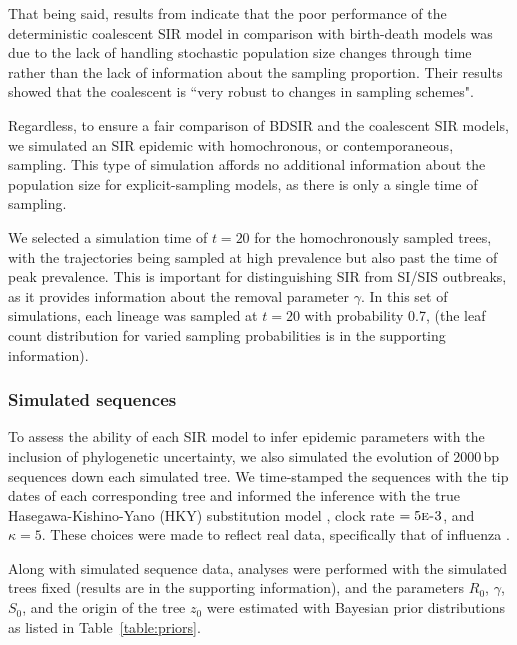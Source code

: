 \documentclass[12pt,titlepage]{article}
\begin{document}
That being said, results from \cite{Veronika} indicate that the poor performance of the deterministic coalescent SIR model in comparison with birth-death models was due to the lack of handling 
stochastic population size changes through time rather than the lack of information about the sampling proportion.  
Their results showed that the coalescent is ``very robust to changes in sampling schemes".

Regardless, to ensure a fair comparison of BDSIR and the coalescent SIR models, we simulated an SIR epidemic with homochronous, or contemporaneous, sampling.  This type of simulation affords no additional information about the population size for explicit-sampling models, as there is only a single time of sampling. 

We selected a simulation time of $t=20$ for the homochronously sampled trees, with the trajectories being sampled at high prevalence but also past the time of peak prevalence.  This is important for distinguishing SIR from SI/SIS outbreaks, as it provides information about the removal parameter $\gamma$.
In this set of simulations, each lineage was sampled at $t=20$ with probability 0.7, (the leaf count distribution for varied sampling probabilities is in the supporting information).


\subsubsection{Simulated sequences}
To assess the ability of each SIR model to infer epidemic parameters with the inclusion of phylogenetic uncertainty, we also simulated the evolution of 2000\,bp sequences down each simulated tree.  
We time-stamped the sequences with the tip dates of each corresponding tree and informed the inference with the true Hasegawa-Kishino-Yano (HKY) substitution model \citep{Hasegawa:1985}, clock rate $=5\mbox{\sc{e}-3}$, and $\kappa=5$.  
These choices were made to reflect real data, specifically that of influenza \citep{Vaughan:2014}. 

Along with simulated sequence data, analyses were performed with the simulated trees fixed (results are in the supporting information), and the parameters $R_0$, $\gamma$, $S_{0}$, and the origin of the tree $z_0$ were 
estimated with Bayesian prior distributions as listed in Table~\ref{table:priors}.
\end{document}
